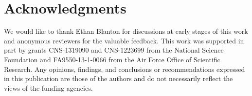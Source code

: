 \documentclass[11pt]{article}
\begin{document}
\section*{Acknowledgments}

We would like to thank Ethan Blanton for discussions at early stages of this
work and anonymous reviewers for the valuable feedback.
This work was supported in part by grants CNS-1319090 and CNS-1223699
from the National Science Foundation and FA9550-13-1-0066 from the Air
Force Office of Scientific Research. Any opinions, findings, and
conclusions or recommendations expressed in this publication are those
of the authors and do not necessarily reflect the views of the funding
agencies.


 
\end{document}
